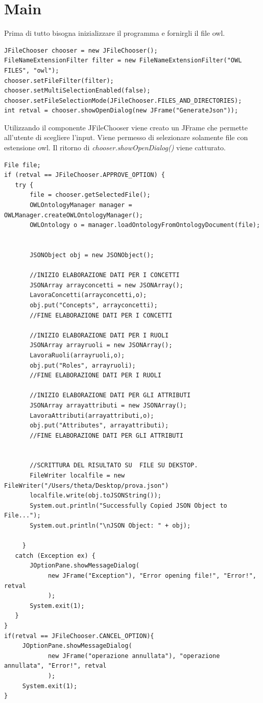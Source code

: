 \documentclass[Lau,binding=0.6cm]{sapthesis}
\begin{document}
\section{Main}
Prima di tutto bisogna inizializzare il programma e fornirgli il file owl.
\begin{verbatim}
JFileChooser chooser = new JFileChooser();
FileNameExtensionFilter filter = new FileNameExtensionFilter("OWL FILES", "owl");
chooser.setFileFilter(filter);
chooser.setMultiSelectionEnabled(false);
chooser.setFileSelectionMode(JFileChooser.FILES_AND_DIRECTORIES);
int retval = chooser.showOpenDialog(new JFrame("GenerateJson"));
\end{verbatim}
Utilizzando il componente JFileChooser viene creato un JFrame che permette all'utente di scegliere l'input. Viene permesso di selezionare solamente file con estensione owl. Il ritorno di \textit{chooser.showOpenDialog()} viene catturato.\\
\begin{verbatim}
File file;
if (retval == JFileChooser.APPROVE_OPTION) {
   try { 
       file = chooser.getSelectedFile();
       OWLOntologyManager manager = OWLManager.createOWLOntologyManager();
       OWLOntology o = manager.loadOntologyFromOntologyDocument(file);


       JSONObject obj = new JSONObject();

       //INIZIO ELABORAZIONE DATI PER I CONCETTI
       JSONArray arrayconcetti = new JSONArray();
       LavoraConcetti(arrayconcetti,o);
       obj.put("Concepts", arrayconcetti);
       //FINE ELABORAZIONE DATI PER I CONCETTI

       //INIZIO ELABORAZIONE DATI PER I RUOLI
       JSONArray arrayruoli = new JSONArray();
       LavoraRuoli(arrayruoli,o);
       obj.put("Roles", arrayruoli);
       //FINE ELABORAZIONE DATI PER I RUOLI

       //INIZIO ELABORAZIONE DATI PER GLI ATTRIBUTI
       JSONArray arrayattributi = new JSONArray();
       LavoraAttributi(arrayattributi,o);
       obj.put("Attributes", arrayattributi);
       //FINE ELABORAZIONE DATI PER GLI ATTRIBUTI


       //SCRITTURA DEL RISULTATO SU  FILE SU DEKSTOP.
       FileWriter localfile = new FileWriter("/Users/theta/Desktop/prova.json") 
       localfile.write(obj.toJSONString());
       System.out.println("Successfully Copied JSON Object to File...");
       System.out.println("\nJSON Object: " + obj);
                
     }
   catch (Exception ex) {
       JOptionPane.showMessageDialog(
       		new JFrame("Exception"), "Error opening file!", "Error!", retval
       		);
       System.exit(1);
   }
}
if(retval == JFileChooser.CANCEL_OPTION){
     JOptionPane.showMessageDialog(
     		new JFrame("operazione annullata"), "operazione annullata", "Error!", retval
     		);
     System.exit(1);
}
\end{verbatim}
\end{document}
